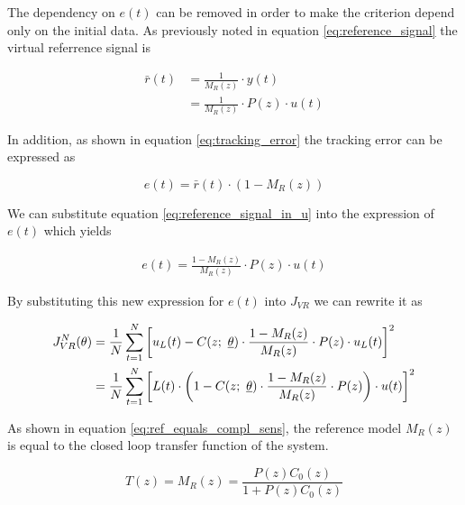 The dependency on \( e(t) \) can be removed in order to make the criterion depend only on the initial data. As previously noted in equation \ref{eq:reference_signal} the virtual referrence signal is  

\begin{equation}
    \begin{aligned}
        \bar{r}(t) &= \frac{1}{M_R(z)} \cdot y(t) \\
                   &= \frac{1}{M_R(z)} \cdot P(z) \cdot u(t)
    \end{aligned}
    \label{eq:reference_signal_in_u}
\end{equation}

In addition, as shown in equation \ref{eq:tracking_error} the tracking error can be expressed as

\begin{equation*}
    e(t) = \bar{r}(t) \cdot (1 - M_R(z))
\end{equation*}

We can substitute equation \ref{eq:reference_signal_in_u} into the expression of \( e(t) \) which yields 

\begin{equation}
    \begin{aligned}
        e(t) = \frac{1 - M_R(z)}{M_R(z)} \cdot P(z) \cdot u(t)
    \end{aligned}
\end{equation}

By substituting this new expression for \( e(t) \) into \( J_{VR} \) we can rewrite it as

\begin{equation}
    \begin{aligned}
        J^N_{VR}(\theta) 
            &= \frac{1}{N} \sum_{t=1}^{N} \left[ u_L(t) - C(z;\ \thetavec) \cdot \frac{1 - M_R(z)}{M_R(z)} \cdot P(z) \cdot u_L(t) \right]^2 \\
            &= \frac{1}{N} \sum_{t=1}^{N} \left[ L(t) \cdot \left( 1 - C(z;\ \thetavec) \cdot \frac{1 - M_R(z)}{M_R(z)} \cdot P(z) \right) \cdot u(t) \right]^2
    \end{aligned} 
    \label{eq:jvr}
\end{equation}

As shown in equation \ref{eq:ref_equals_compl_sens}, the reference model \( M_R(z) \) is equal to the closed loop transfer function of the system. 

\begin{equation}
    T(z) = M_R(z) = \frac{P(z) C_0(z)}{1 + P(z) C_0(z)} 
    \label{eq:ref_in_pc}
\end{equation}

